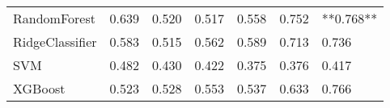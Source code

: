 \begin{tabular}{lllllll}
                   RandomForest & 0.639 &                     0.520 &                 0.517 &                  0.558 &                                   0.752 & **0.768** \\
                RidgeClassifier & 0.583 &                     0.515 &                 0.562 &                  0.589 &                                   0.713 &     0.736 \\
                            SVM & 0.482 &                     0.430 &                 0.422 &                  0.375 &                                   0.376 &     0.417 \\
                        XGBoost & 0.523 &                     0.528 &                 0.553 &                  0.537 &                                   0.633 &     0.766 \\
\bottomrule
\end{tabular}
